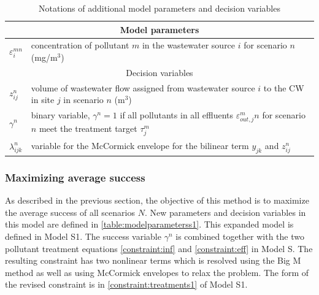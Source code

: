 \documentclass[preprint,12pt,authoryear]{elsarticle}
\begin{document}
\begin{table}[!htb]
	\setlength{\extrarowheight}{1.5mm}
	\caption{Notations of additional model parameters and decision variables}
	\begin{tabular}{|p{1.5cm} p{16cm}|}
		\hline
		\multicolumn{2}{|c|}{Model parameters} \\
		\hline
		$\varepsilon_i^{mn}$ & concentration of pollutant $m$ in the wastewater source $i$ for scenario $n$ (mg/m$^3$)\\
		\hline
		\multicolumn{2}{|c|}{Decision variables}\\
		\hline	
		$z_{ij}^n$ & volume of wastewater flow assigned from wastewater source $i$ to the CW in site $j$ in scenario $n$  (m$^3$)\\
		$\gamma^n$ & binary variable, $\gamma^n = 1$ if all pollutants in all effluents $\varepsilon_{out,j}^mn$ for scenario $n$ meet the treatment target $\tau_j^m$\\
		$\lambda_{ijk}^n$ & variable for the McCormick envelope for the bilinear term $y_{jk}$ and $z_{ij}^n$\\ 
		\hline	
	\end{tabular}
	\label{table:modelparameterss1}
\end{table}

\subsubsection{Maximizing average success}\label{subsect:maxsuccess}
As described in the previous section, the objective of this method is to maximize the average success of all scenarios $N$. New parameters and decision variables in this model are defined in \autoref{table:modelparameterss1}. This expanded model is defined in Model S1. The success variable $\gamma^n$ is combined together with the two pollutant treatment equations \ref{constraint:inf} and \ref{constraint:eff} in Model S. The resulting constraint has two nonlinear terms which is resolved using the Big M method as well as using McCormick envelopes to relax the problem. The form of the revised constraint is in \autoref{constraint:treatments1} of Model S1.
\end{document}
